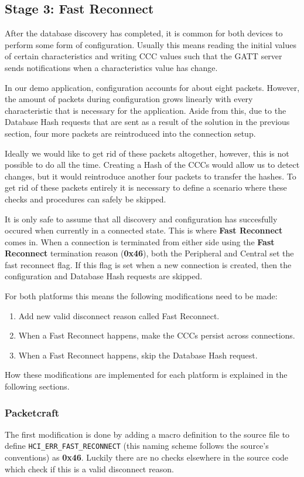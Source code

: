\subsection{Stage 3: Fast Reconnect}
After the database discovery has completed, it is common for both devices to perform some form of configuration. Usually this means reading the initial values of certain characteristics and writing CCC values such that the GATT server sends notifications when a characteristics value has change. 

In our demo application, configuration accounts for about eight packets. However, the amount of packets during configuration grows linearly with every characteristic that is necessary for the application. Aside from this, due to the Database Hash requests that are sent as a result of the solution in the previous section, four more packets are reintroduced into the connection setup.

Ideally we would like to get rid of these packets altogether, however, this is not possible to do all the time. Creating a Hash of the CCCs would allow us to detect changes, but it would reintroduce another four packets to transfer the hashes. To get rid of these packets entirely it is necessary to define a scenario where these checks and procedures can safely be skipped.

It is only safe to assume that all discovery and configuration has succesfully occured when currently in a connected state. This is where \textbf{Fast Reconnect} comes in. When a connection is terminated from either side using the \textbf{Fast Reconnect} termination reason (\textbf{0x46}), both the Peripheral and Central set the fast reconnect flag. If this flag is set when a new connection is created, then the configuration and Database Hash requests are skipped. 

For both platforms this means the following modifications need to be made:
\begin{enumerate}
    \item Add new valid disconnect reason called Fast Reconnect.
    \item When a Fast Reconnect happens, make the CCCs persist across connections.
    \item When a Fast Reconnect happens, skip the Database Hash request.
\end{enumerate}
How these modifications are implemented for each platform is explained in the following sections.

\subsubsection{Packetcraft}
The first modification is done by adding a macro definition to the source file to define \texttt{HCI\_ERR\_FAST\_RECONNECT} (this naming scheme follows the source's conventions) as \textbf{0x46}. Luckily there are no checks elsewhere in the source code which check if this is a valid disconnect reason.

